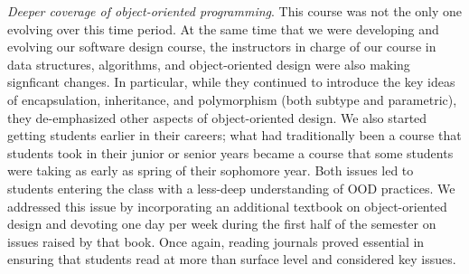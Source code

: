 \textit{Deeper coverage of object-oriented programming}.  This
course was not the only one evolving over this time period.  At the
same time that we were developing and evolving our software design
course, the instructors in charge of our course in data structures,
algorithms, and object-oriented design were also making signficant
changes.  In particular, while they continued to introduce the key
ideas of encapsulation, inheritance, and polymorphism (both subtype
and parametric), they de-emphasized other aspects of object-oriented
design.  We also started getting students earlier in their careers;
what had traditionally been a course that students took in their
junior or senior years became a course that some students were
taking as early as spring of their sophomore year.  Both issues led
to students entering the class with a less-deep understanding of
OOD practices.  We addressed this issue by incorporating an additional
textbook on object-oriented design \cite{poodr} and devoting one day
per week during the first half of the semester on issues raised by that
book.  Once again, reading journals proved essential in ensuring that
students read at more than surface level and considered key issues.

